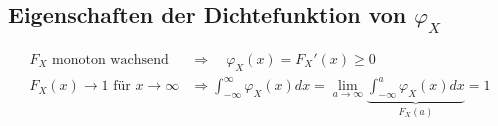 \documentclass[10pt,a4paper]{scrartcl}
\newif\ifincludeExamples
\begin{document}
\subsection{Eigenschaften der Dichtefunktion von $\varphi_X$ } %
\begin{align}
F_X \text{ monoton wachsend } &\Rightarrow \quad\varphi_X(x) = F_X'(x) \ge 0 \\
F_X(x) \to 1 \text{ für } x\to \infty &\Rightarrow \int_{-\infty}^\infty \varphi_X(x) dx 
  = \lim_{a\to\infty} \underbrace{\int_{-\infty}^a\varphi_X(x) dx}_{F_X(a)} = 1
\end{align}

\ifincludeExamples
\begin{align*}
\varphi(x) = \begin{cases}a\cos x & -\frac{\pi}{2} \le x \frac{\pi}{2} \\ 0 & \text{ sonst}\end{cases} \\
\varphi(x) \ge 0 & \forall x\in\mathbb{R} \text{ ok} \\
\int_{-\infty}^\infty \varphi(x) dx = \int_{-\frac{\pi}{2}}^\frac{\pi}{2} a\cos x dx = a\left[sin x\right]_{-\frac{\pi}{2}}^\frac{\pi}{2} = 2a
\end{align*}
Also eine gültige Dichtefunktion für $a=\frac{1}{2}$
\begin{align*}
F(X) = \int_{-\infty}^x \varphi(\xi)d\xi = \int_{-\frac{\pi}{2}}^x \frac{1}{2}\cos\xi d\xi = \frac{1}{2}\left(sin(x) + 1\right)
\end{align*}
\fi
\end{document}
